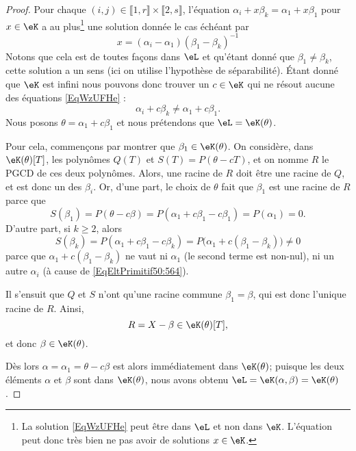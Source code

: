 \begin{proof}
    Pour chaque \( (i,j)\in \llbracket 1,r\rrbracket \times \llbracket 2,s\rrbracket \), l'équation \( \alpha_i+x\beta_k=\alpha_1+x\beta_1\) pour \( x\in \eK\) a au plus\footnote{La solution \eqref{EqWzUFHe} peut être dans \( \eL\) et non dans \( \eK\). L'équation peut donc très bien ne pas avoir de solutions \( x\in \eK\).} une solution donnée le cas échéant par
    \begin{equation}    \label{EqWzUFHe}
        x=(\alpha_i-\alpha_1)(\beta_1-\beta_k)^{-1}
    \end{equation}
    Notons que cela est de toutes façons dans \( \eL\) et qu'étant donné que \( \beta_1\neq \beta_k\), cette solution a un sens (ici on utilise l'hypothèse de séparabilité). Étant donné que \( \eK\) est infini nous pouvons donc trouver un \( c\in \eK\) qui ne résout aucune des équations \eqref{EqWzUFHe} :
    \begin{equation}\label{eqEltPrimitif50:564}
        \alpha_i+c\beta_k\neq \alpha_1+c\beta_1.
    \end{equation}
    Nous posons \( \theta=\alpha_1+c\beta_1\) et nous prétendons que \( \eL=\eK(\theta)\).

    Pour cela, commençons par montrer que \( \beta_1 \in \eK(\theta)\). On considère, dans \( \eK(\theta)[T]\), les polynômes \( Q(T)\) et \( S(T)=P(\theta-cT)\), et on nomme \( R\) le PGCD de ces deux polynômes. Alors, une racine de \( R\) doit être une racine de \( Q\), et est donc un des \( \beta_i\). Or, d'une part, le choix de \( \theta\) fait que \( \beta_1\) est une racine de \( R\) parce que
    \begin{equation}
        S(\beta_1)=P(\theta-c\beta)=P(\alpha_1+c\beta_1-c\beta_1)=P(\alpha_1)=0.
    \end{equation}
    D'autre part, si \( k\geq 2\), alors
    \begin{equation}
        S(\beta_k)=P(\alpha_1 + c \beta_1 - c \beta_k) = P\big(\alpha_1 +c(\beta_1-\beta_k)\big)\neq 0
    \end{equation}
    parce que \( \alpha_1 +c(\beta_1 - \beta_k)\) ne vaut ni \( \alpha_1 \) (le second terme est non-nul), ni un autre \( \alpha_i\) (à cause de \eqref{EqEltPrimitif50:564}).

    Il s'ensuit que \( Q \) et \(S \) n'ont qu'une racine commune \( \beta_1 = \beta \), qui est donc l'unique racine de \( R\). Ainsi,
    \begin{equation}
        R=X-\beta\in \eK(\theta)[T],
    \end{equation}
    et donc \( \beta\in \eK(\theta)\).

    Dès lors \( \alpha=\alpha_1=\theta-c\beta\) est alors immédiatement dans \( \eK(\theta)\); puisque les deux éléments \( \alpha\) et \( \beta\) sont dans \( \eK(\theta)\), nous avons obtenu \( \eL=\eK(\alpha,\beta)=\eK(\theta)\).

\end{proof}

